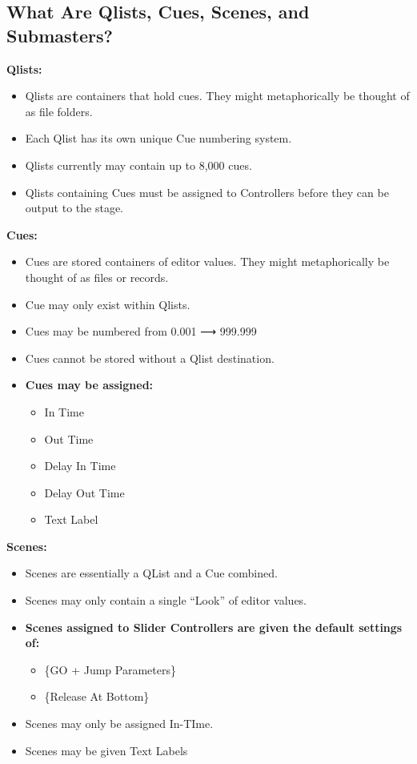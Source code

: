 \documentclass[
]{article}
\begin{document}
\hypertarget{what-are-qlists-cues-scenes-and-submasters}{%
\subsection{What Are Qlists, Cues, Scenes, and Submasters?}\label{what-are-qlists-cues-scenes-and-submasters}}

\textbf{Qlists:}

\begin{itemize}
\item
  Qlists are containers that hold cues. They might metaphorically be thought of as file folders.
\item
  Each Qlist has its own unique Cue numbering system.
\item
  Qlists currently may contain up to 8,000 cues.
\item
  Qlists containing Cues must be assigned to Controllers before they can be output to the stage.
\end{itemize}

\textbf{Cues:}

\begin{itemize}
\item
  Cues are stored containers of editor values. They might metaphorically be thought of as files or records.
\item
  Cue may only exist within Qlists.
\item
  Cues may be numbered from 0.001 ⟶ 999.999
\item
  Cues cannot be stored without a Qlist destination.
\item
  \textbf{Cues may be assigned:}

  \begin{itemize}
  \item
    In Time
  \item
    Out Time
  \item
    Delay In Time
  \item
    Delay Out Time
  \item
    Text Label
  \end{itemize}
\end{itemize}

\textbf{Scenes:}

\begin{itemize}
\item
  Scenes are essentially a QList and a Cue combined.
\item
  Scenes may only contain a single ``Look'' of editor values.
\item
  \textbf{Scenes assigned to Slider Controllers are given the default settings of:}

  \begin{itemize}
  \item
    \{GO + Jump Parameters\}
  \item
    \{Release At Bottom\}
  \end{itemize}
\item
  Scenes may only be assigned In-TIme.
\item
  Scenes may be given Text Labels
\end{itemize}
\end{document}
